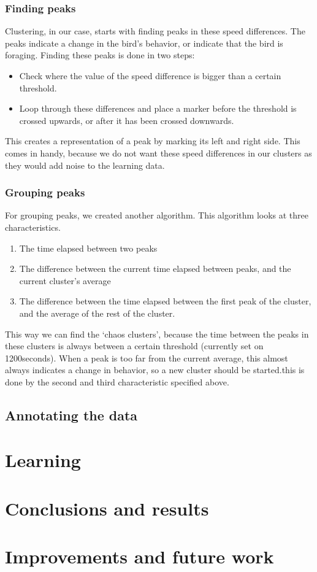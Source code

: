 \documentclass[a4paper,10pt]{article}
\newcommand{\timeThreshold}{1200}
\begin{document}
 \subsubsection{Finding peaks}
 Clustering, in our case, starts with finding peaks in these speed differences.
 The peaks indicate a change in the bird's behavior, or indicate that the bird
 is foraging. Finding these peaks is done in two steps:

 \begin{itemize}
    \item Check where the value of the speed difference is bigger than a certain
    threshold.
    \item Loop through these differences and place a marker before the threshold
    is crossed upwards, or after it has been crossed downwards. 
 \end{itemize}
 
 This creates a representation of a peak by marking its left and right side.
 This comes in handy, because we do not want these speed differences in our
 clusters as they would add noise to the learning data.

 \subsubsection{Grouping peaks}
 For grouping peaks, we created another algorithm. This algorithm looks at three
 characteristics.  
 \begin{enumerate}
 \item The time elapsed between two peaks
 \item The difference between the current time elapsed between peaks, and the
 current cluster's average
 \item The difference between the time elapsed between the first peak of the
 cluster, and the average of the rest of the cluster.
 \end{enumerate}
 This way we can find the `chaos clusters', because the time between the peaks
 in these clusters is always between a certain threshold (currently set on
 \timeThreshold seconds). 
 When a peak is too far from the  current average, this almost always indicates
 a change in behavior, so a new cluster should be started.this is done by the
 second and third characteristic specified above.


 \subsection{Annotating the data}


\section{Learning}

\section{Conclusions and results}

\section{Improvements and future work}
\end{document}
